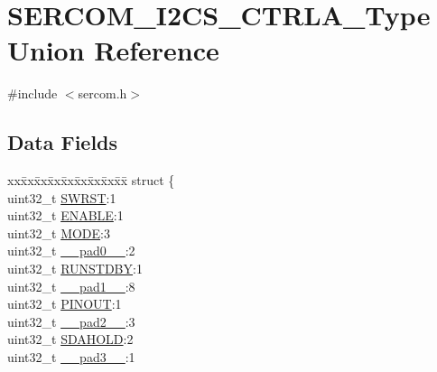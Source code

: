 \hypertarget{union_s_e_r_c_o_m___i2_c_s___c_t_r_l_a___type}{}\section{S\+E\+R\+C\+O\+M\+\_\+\+I2\+C\+S\+\_\+\+C\+T\+R\+L\+A\+\_\+\+Type Union Reference}
\label{union_s_e_r_c_o_m___i2_c_s___c_t_r_l_a___type}


{\ttfamily \#include $<$sercom.\+h$>$}

\subsection*{Data Fields}
\begin{DoxyCompactItemize}
\item 
\begin{tabbing}
xx\=xx\=xx\=xx\=xx\=xx\=xx\=xx\=xx\=\kill
struct \{\\
\>uint32\_t \mbox{\hyperlink{union_s_e_r_c_o_m___i2_c_s___c_t_r_l_a___type_a34cd956a8da179cbd5fc9060306d420e}{SWRST}}:1\\
\>uint32\_t \mbox{\hyperlink{union_s_e_r_c_o_m___i2_c_s___c_t_r_l_a___type_a66f979832c85e0692bd9422b05aff1f7}{ENABLE}}:1\\
\>uint32\_t \mbox{\hyperlink{union_s_e_r_c_o_m___i2_c_s___c_t_r_l_a___type_aad9612db6a93afb1482213d2d36f1c5e}{MODE}}:3\\
\>uint32\_t \mbox{\hyperlink{union_s_e_r_c_o_m___i2_c_s___c_t_r_l_a___type_a3e57c2ef1c3ffb36722f000cc1156824}{\_\_pad0\_\_}}:2\\
\>uint32\_t \mbox{\hyperlink{union_s_e_r_c_o_m___i2_c_s___c_t_r_l_a___type_a5656560aef3eaf5aac89b68b9fe39c3a}{RUNSTDBY}}:1\\
\>uint32\_t \mbox{\hyperlink{union_s_e_r_c_o_m___i2_c_s___c_t_r_l_a___type_a6712ba6dd1d5b43d2d56ff8ac4e275a7}{\_\_pad1\_\_}}:8\\
\>uint32\_t \mbox{\hyperlink{union_s_e_r_c_o_m___i2_c_s___c_t_r_l_a___type_af34043eac13028b9bd17d4ac6432b1b4}{PINOUT}}:1\\
\>uint32\_t \mbox{\hyperlink{union_s_e_r_c_o_m___i2_c_s___c_t_r_l_a___type_a9ce12a63de64ef64ae2d59d128251cae}{\_\_pad2\_\_}}:3\\
\>uint32\_t \mbox{\hyperlink{union_s_e_r_c_o_m___i2_c_s___c_t_r_l_a___type_acdfc2515046dc3a3c412b210176bbc3c}{SDAHOLD}}:2\\
\>uint32\_t \mbox{\hyperlink{union_s_e_r_c_o_m___i2_c_s___c_t_r_l_a___type_a4854608c0e776f0704a4d9a4b98ea57d}{\_\_pad3\_\_}}:1\\

\end{tabbing}
\end{DoxyCompactItemize}
